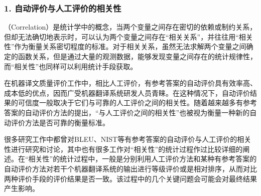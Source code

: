 
\subsubsection{1. 自动评价与人工评价的相关性}

（Correlation）是统计学中的概念，当两个变量之间存在密切的依赖或制约关系，但却无法确切地表示时，可以认为两个变量之间存在“相关关系”，并往往用“相关性”作为衡量关系密切程度的标准。对于相关关系，虽然无法求解两个变量之间确定的函数关系，但是通过大量的观测数据，能够发现变量之间存在的统计规律性，而“相关性”也同样可以利用统计手段获取。

\parinterval 在机器译文质量评价工作中，相比人工评价，有参考答案的自动评价具有效率高、成本低的优点，因而广受机器翻译系统研发人员青睐。在这种情况下，自动评价结果的可信度一般取决于它们与可靠的人工评价之间的相关性。随着越来越多有参考答案的自动评价方法的提出，“与人工评价之间的相关性”也被视为衡量一种新的自动评价方法是否可靠的衡量标准。

\parinterval 很多研究工作中都曾对BLEU、NIST等有参考答案的自动评价与人工评价的相关性进行研究和讨论，其中也有很多工作对“相关性”的统计过程作过比较详细的阐述。在“相关性”的统计过程中，一般是分别利用人工评价方法和某种有参考答案的自动评价方法对若干个机器翻译系统的输出进行等级评价或是相对排序，从而对比两种评价手段的评价结果是否一致。该过程中的几个关键问题会可能会对最终结果产生影响。

